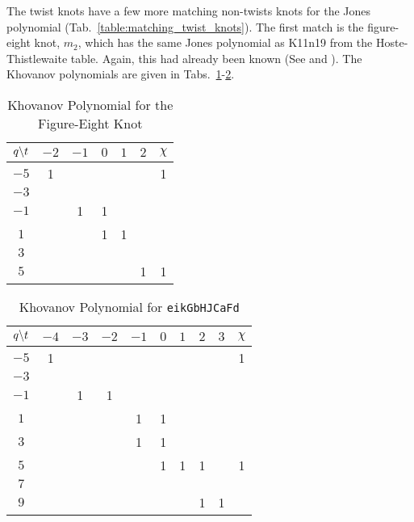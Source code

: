     The twist knots have a few more matching non-twists knots for the
    Jones polynomial
    (Tab.~\ref{table:matching_twist_knots}). The first match is the
    figure-eight knot, $m_{2}$, which has the same Jones polynomial as
    K11n19 from the Hoste-Thistlewaite table.
    Again, this had already been known
    (See \cite{KatlasFigureEight} and \cite{KatlasK11n19}).
    The Khovanov polynomials are
    given in Tabs.~\ref{table:m_2_kho}-\ref{table:eikGbHJCaFd_kho}.
    \begin{table}
        \centering
        \begin{tabular}{| c | c | c | c | c | c | c |}
            \hline
            $q\symbol{92}t$&$-2$&$-1$&$0$&$1$&$2$&$\chi$\\
            \hline
            $-5$&1&&&&&1\\
            \hline
            $-3$&&&&&&\\
            \hline
            $-1$&&1&1&&&\\
            \hline
            $1$&&&1&1&&\\
            \hline
            $3$&&&&&&\\
            \hline
            $5$&&&&&1&1\\
            \hline
        \end{tabular}
        \caption{Khovanov Polynomial for the Figure-Eight Knot}
        \label{table:m_2_kho}
    \end{table}
    \begin{table}
        \centering
        \begin{tabular}{| c | c | c | c | c | c | c | c | c | c |}
            \hline
            $q\symbol{92}t$&$-4$&$-3$&$-2$&$-1$&$0$&$1$&$2$&$3$&$\chi$\\
            \hline
            $-5$&1&&&&&&&&1\\
            \hline
            $-3$&&&&&&&&&\\
            \hline
            $-1$&&1&1&&&&&&\\
            \hline
            $1$&&&&1&1&&&&\\
            \hline
            $3$&&&&1&1&&&&\\
            \hline
            $5$&&&&&1&1&1&&1\\
            \hline
            $7$&&&&&&&&&\\
            \hline
            $9$&&&&&&&1&1&\\
            \hline
        \end{tabular}
        \caption{Khovanov Polynomial for \texttt{eikGbHJCaFd}}
        \label{table:eikGbHJCaFd_kho}
    \end{table}
